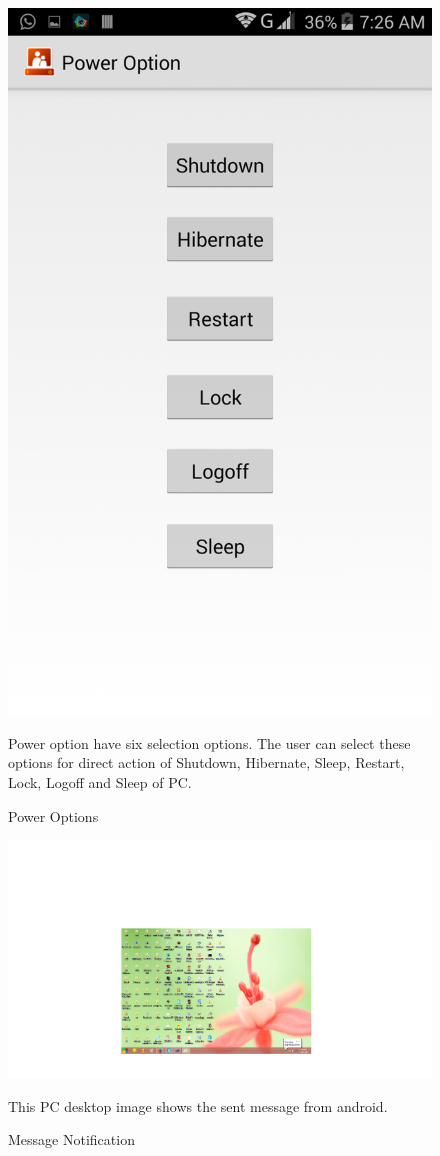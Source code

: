\begin{figure}
\begin{center}
\scalebox{0.25}
{\includegraphics{power.png}}
\caption{Power Options}  
\end{center}
Power option have six selection options. The user can select these options for direct action of Shutdown, Hibernate, Sleep, Restart, Lock, Logoff and Sleep of PC.   
\end{figure}

\begin{figure}
\begin{center}
\scalebox{0.40}
{\includegraphics{notify.png}}
\caption{Message Notification}  
\end{center}
This PC desktop image shows the sent message from android.  
\end{figure}

